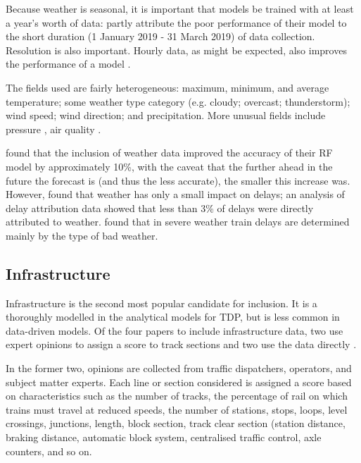 \documentclass{article}
\begin{document}
Because weather is seasonal, it is important that models be trained with at least a year's worth of data: \cite{wang_et_al_2019} partly attribute the poor performance of their model to the short duration (1 January 2019 - 31 March 2019) of data collection. Resolution is also important. Hourly data, as might be expected, also improves the performance of a model \cite{nabian_et_al_2019}\cite{wang_et_al_2019}.

The fields used are fairly heterogeneous: maximum, minimum, and average temperature; some weather type category (e.g. cloudy; overcast; thunderstorm); wind speed; wind direction; and precipitation. More unusual fields include pressure \cite{oneto_et_al_2019}\cite{oneto_et_al_2016}\cite{oneto_et_al_2017b}, air quality \cite{wang_et_al_2019}.

\cite{oneto_et_al_2016} found that the inclusion of weather data improved the accuracy of their RF model by approximately 10\%, with the caveat that the further ahead in the future the forecast is (and thus the less accurate), the smaller this increase was. However, \cite{nair_et_al_2019} found that weather has only a small impact on delays; an analysis of delay attribution data showed that less than 3\% of delays were directly attributed to weather. \cite{wang_et_al_2019} found that in severe weather train delays are determined mainly by the type of bad weather. 


\subsection{Infrastructure}

Infrastructure is the second most popular candidate for inclusion.  It is a thoroughly modelled in the analytical models for TDP, but is less common in data-driven models. Of the four papers to include infrastructure data, two use expert opinions to assign a score to track sections \cite{markovic_et_al_2015}\cite{milinkovic_et_al_2013}  and two use the data directly \cite{barbour_et_al_2018}\cite{nair_et_al_2019}.

In the former two, opinions are collected from traffic dispatchers, operators, and subject matter experts. Each line or section considered is assigned a score based on characteristics such as the number of tracks, the percentage of rail on which trains must travel at reduced speeds, the number of stations, stops, loops, level crossings, junctions, length, block section, track clear section (station distance, braking distance, automatic block system, centralised traffic control, axle counters, and so on.  
\end{document}

